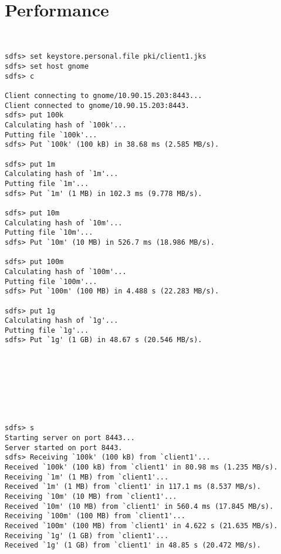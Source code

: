 \documentclass[10pt]{article}
\begin{document}
\section{Performance}

\begin{verbatim}


sdfs> set keystore.personal.file pki/client1.jks
sdfs> set host gnome
sdfs> c

Client connecting to gnome/10.90.15.203:8443...
Client connected to gnome/10.90.15.203:8443.
sdfs> put 100k
Calculating hash of `100k'...
Putting file `100k'...
sdfs> Put `100k' (100 kB) in 38.68 ms (2.585 MB/s).

sdfs> put 1m
Calculating hash of `1m'...
Putting file `1m'...
sdfs> Put `1m' (1 MB) in 102.3 ms (9.778 MB/s).

sdfs> put 10m
Calculating hash of `10m'...
Putting file `10m'...
sdfs> Put `10m' (10 MB) in 526.7 ms (18.986 MB/s).

sdfs> put 100m
Calculating hash of `100m'...
Putting file `100m'...
sdfs> Put `100m' (100 MB) in 4.488 s (22.283 MB/s).

sdfs> put 1g
Calculating hash of `1g'...
Putting file `1g'...
sdfs> Put `1g' (1 GB) in 48.67 s (20.546 MB/s).








sdfs> s
Starting server on port 8443...
Server started on port 8443.
sdfs> Receiving `100k' (100 kB) from `client1'...
Received `100k' (100 kB) from `client1' in 80.98 ms (1.235 MB/s).
Receiving `1m' (1 MB) from `client1'...
Received `1m' (1 MB) from `client1' in 117.1 ms (8.537 MB/s).
Receiving `10m' (10 MB) from `client1'...
Received `10m' (10 MB) from `client1' in 560.4 ms (17.845 MB/s).
Receiving `100m' (100 MB) from `client1'...
Received `100m' (100 MB) from `client1' in 4.622 s (21.635 MB/s).
Receiving `1g' (1 GB) from `client1'...
Received `1g' (1 GB) from `client1' in 48.85 s (20.472 MB/s).


\end{verbatim}
\end{document}
